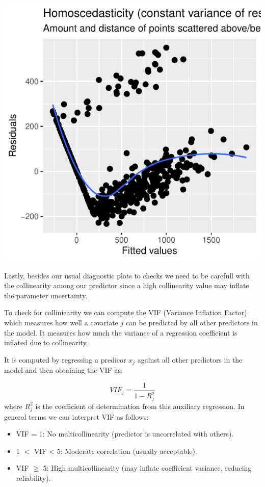 \documentclass[
  letterpaper,
  DIV=11,
  numbers=noendperiod]{scrartcl}
\begin{document}
\begin{tcolorbox}
\begin{center}
\includegraphics{index_files/figure-pdf/unnamed-chunk-34-3.pdf}
\end{center}

\end{tcolorbox}

Lastly, besides our usual diagnostic plots to checks we need to be
carefull with the collinearity among our predictor since a high
collinearity value may inflate the parameter uncertainty.

To check for colliniearity we can compute the VIF (Variance Inflation
Factor) which measures how well a covariate \(j\) can be predicted by
all other predictors in the model. It measures how much the variance of
a regression coefficient is inflated due to collinearity.

It is computed by regressing a predicor \(x_j\) against all other
predictors in the model and then obtaining the VIF as:

\[
VIF_j = \frac{1}{1-R^2_j}
\] where \(R^2_j\) is the coefficient of determination from this
auxiliary regression. In general terms we can interpret VIF as follows:

\begin{itemize}
\item
  VIF = 1: No multicollinearity (predictor is uncorrelated with others).
\item
  1 \(<\) VIF \textless{} 5: Moderate correlation (usually acceptable).
\item
  VIF \(\geq\) 5: High multicollinearity (may inflate coefficient
  variance, reducing reliability).
\end{itemize}
\end{document}
